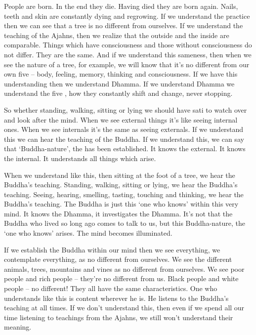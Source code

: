 People are born. In the end they die. Having died they are born again. Nails, teeth and skin are constantly dying and regrowing. If we understand the practice then we can see that a tree is no different from ourselves. If we understand the teaching of the Ajahns, then we realize that the outside and the inside are comparable. Things which have consciousness and those without consciousness do not differ. They are the same. And if we understand this sameness, then when we see the nature of a tree, for example, we will know that it's no different from our own five  -- body, feeling, memory, thinking and consciousness. If we have this understanding then we understand Dhamma. If we understand Dhamma we understand the five , how they constantly shift and change, never stopping.

So whether standing, walking, sitting or lying we should have sati to watch over and look after the mind. When we see external things it's like seeing internal ones. When we see internals it's the same as seeing externals. If we understand this we can hear the teaching of the Buddha. If we understand this, we can say that `Buddha-nature', the  has been established. It knows the external. It knows the internal. It understands all things which arise.

When we understand like this, then sitting at the foot of a tree, we hear the Buddha's teaching. Standing, walking, sitting or lying, we hear the Buddha's teaching. Seeing, hearing, smelling, tasting, touching and thinking, we hear the Buddha's teaching. The Buddha is just this `one who knows' within this very mind. It knows the Dhamma, it investigates the Dhamma. It's not that the Buddha who lived so long ago comes to talk to us, but this Buddha-nature, the `one who knows' arises. The mind becomes illuminated.

If we establish the Buddha within our mind then we see everything, we contemplate everything, as no different from ourselves. We see the different animals, trees, mountains and vines as no different from ourselves. We see poor people and rich people -- they're no different from us. Black people and white people -- no different! They all have the same characteristics. One who understands like this is content wherever he is. He listens to the Buddha's teaching at all times. If we don't understand this, then even if we spend all our time listening to teachings from the Ajahns, we still won't understand their meaning.

